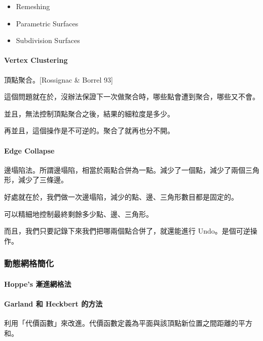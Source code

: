 \documentclass[
]{article}
\begin{document}
\begin{itemize}
\item
  Remeshing
\item
  Parametric Surfaces
\item
  Subdivision Surfaces
\end{itemize}

\hypertarget{header-n25}{%
\paragraph{Vertex Clustering}\label{header-n25}}

頂點聚合。{[}Rossignac \& Borrel 93{]}

這個問題就在於，沒辦法保證下一次做聚合時，哪些點會遭到聚合，哪些又不會。

並且，無法控制頂點聚合之後，結果的細粒度是多少。

再並且，這個操作是不可逆的。聚合了就再也分不開。

\hypertarget{header-n30}{%
\paragraph{Edge Collapse}\label{header-n30}}

邊塌陷法。所謂邊塌陷，相當於兩點合併為一點。減少了一個點，減少了兩個三角形，減少了三條邊。

好處就在於，我們做一次邊塌陷，減少的點、邊、三角形數目都是固定的。

可以精細地控制最終剩餘多少點、邊、三角形。

而且，我們只要記錄下來我們把哪兩個點合併了，就還能進行
Undo。是個可逆操作。

\hypertarget{header-n35}{%
\subsubsection{動態網格簡化}\label{header-n35}}

\hypertarget{header-n36}{%
\paragraph{Hoppe's 漸進網格法}\label{header-n36}}

\hypertarget{header-n37}{%
\paragraph{Garland 和 Heckbert 的方法}\label{header-n37}}

利用「代價函數」來改進。代價函數定義為平面與該頂點新位置之間距離的平方和。
\end{document}
